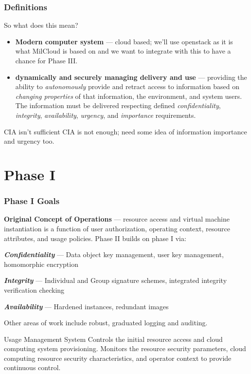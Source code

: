 \documentclass[t,handout]{beamer}
\begin{document}
\begin{frame}
\frametitle{Definitions}
So what does this mean? \\
\begin{itemize}
\item {\small {\bf Modern computer system} --- cloud based; we'll use openstack as it is what MilCloud is based on and we want to integrate with this to have a chance for Phase III.}
\item {\small {\bf dynamically and securely managing delivery and use} --- providing the ability to {\sl autonomously} provide and retract access to information based on {\sl changing properties} of that information, the environment, and system users.  The information must be delivered respecting defined {\sl confidentiality}, {\sl integrity}, {\sl availability}, {\sl urgency}, and {\sl importance} requirements.}
\end{itemize}
\begin{beamerboxesrounded}[shadow]{CIA isn't sufficient}
{\small CIA is not enough; need some idea of information importance and urgency too.}
\end{beamerboxesrounded}
\end{frame}

\section{Phase I}

\begin{frame}
\frametitle{Phase I Goals}
{\bf Original Concept of Operations} --- resource access and virtual machine instantiation is a function of user authorization, operating context, resource attributes, and usage policies.  Phase II builds on phase I via:
\begin{itemize}
{\small
\item \textit{\textbf{Confidentiality}} --- Data object key management, user key management, homomorphic encryption
\item \textit{\textbf{Integrity}} --- Individual and Group signature schemes, integrated integrity verification checking
\item \textit{\textbf{Availability}} --- Hardened instances, redundant images
}
\end{itemize}
Other areas of work include robust, graduated logging and auditing.

\begin{beamerboxesrounded}[shadow]{Usage Management System}
{\small Controls the initial resource access and cloud computing system provisioning.
Monitors the resource security parameters, cloud computing resource security characteristics, and operator context to provide continuous control.}
\end{beamerboxesrounded}

\end{frame}
\end{document}
